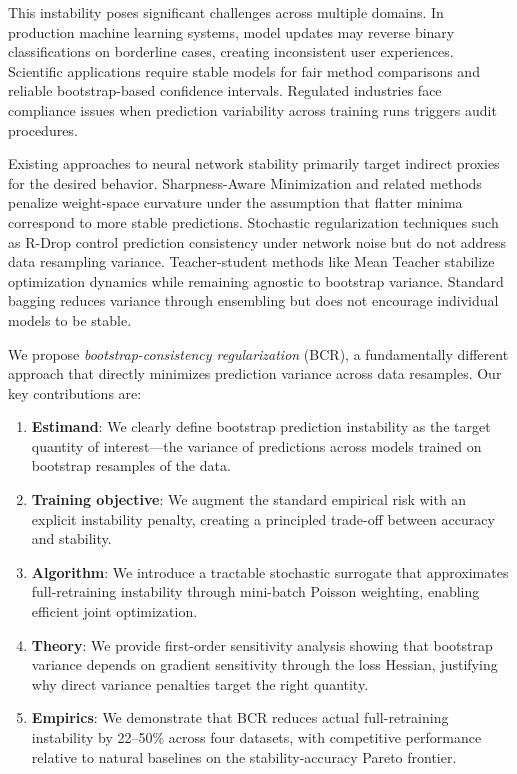 \documentclass[12pt, letterpaper]{article}
\begin{document}
This instability poses significant challenges across multiple domains. In production machine learning systems, model updates may reverse binary classifications on borderline cases, creating inconsistent user experiences. Scientific applications require stable models for fair method comparisons and reliable bootstrap-based confidence intervals. Regulated industries face compliance issues when prediction variability across training runs triggers audit procedures.

Existing approaches to neural network stability primarily target indirect proxies for the desired behavior. Sharpness-Aware Minimization \citep{foret2020sharpness} and related methods penalize weight-space curvature under the assumption that flatter minima correspond to more stable predictions. Stochastic regularization techniques such as R-Drop \citep{liang2021rdrop} control prediction consistency under network noise but do not address data resampling variance. Teacher-student methods like Mean Teacher \citep{tarvainen2017mean} stabilize optimization dynamics while remaining agnostic to bootstrap variance. Standard bagging \citep{breiman1996bagging} reduces variance through ensembling but does not encourage individual models to be stable.

We propose \emph{bootstrap-consistency regularization} (BCR), a fundamentally different approach that directly minimizes prediction variance across data resamples. Our key contributions are:
\begin{enumerate}
    \item \textbf{Estimand}: We clearly define bootstrap prediction instability as the target quantity of interest---the variance of predictions across models trained on bootstrap resamples of the data.
    \item \textbf{Training objective}: We augment the standard empirical risk with an explicit instability penalty, creating a principled trade-off between accuracy and stability.
    \item \textbf{Algorithm}: We introduce a tractable stochastic surrogate that approximates full-retraining instability through mini-batch Poisson weighting, enabling efficient joint optimization.
    \item \textbf{Theory}: We provide first-order sensitivity analysis showing that bootstrap variance depends on gradient sensitivity through the loss Hessian, justifying why direct variance penalties target the right quantity.
    \item \textbf{Empirics}: We demonstrate that BCR reduces actual full-retraining instability by 22--50\% across four datasets, with competitive performance relative to natural baselines on the stability-accuracy Pareto frontier.
\end{enumerate}
\end{document}

